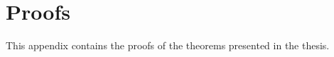 \chapter{Proofs}
\label{app:proofs}

This appendix contains the proofs of the theorems presented in the thesis.
